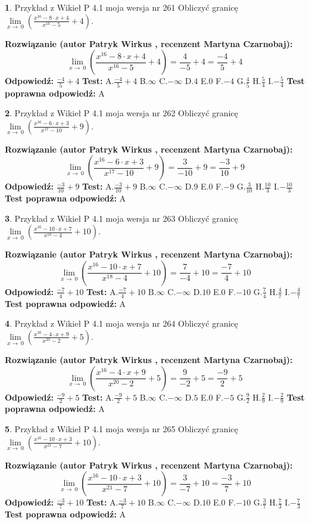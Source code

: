 \documentclass[12pt, a4paper]{article}
\theoremstyle{definition} %
\newtheorem{zad}{}
\newcommand{\zadStart}[1]{\begin{zad}#1\newline}
\newcommand{\zadStop}{\end{zad}}
\newcommand{\rozwStart}[2]{\noindent \textbf{Rozwiązanie (autor #1 , recenzent #2): }\newline}
\newcommand{\rozwStop}{\newline}
\newcommand{\odpStart}{\noindent \textbf{Odpowiedź:}\newline}
\newcommand{\odpStop}{\newline}
\newcommand{\testStart}{\noindent \textbf{Test:}\newline}
\newcommand{\testStop}{\newline}
\newcommand{\kluczStart}{\noindent \textbf{Test poprawna odpowiedź:}\newline}
\newcommand{\kluczStop}{\newline}
\begin{document}
\zadStart{Przykład z Wikieł P 4.1 moja wersja nr 261}
Obliczyć granicę $\lim\limits_{x\to\ 0}(\frac{x^{16}-8 \cdot x +4}{x^{16}-5}+4)$.
\zadStop
\rozwStart{Patryk Wirkus}{Martyna Czarnobaj}
$$\lim\limits_{x\to\ 0}(\frac{x^{16}-8 \cdot x +4}{x^{16}-5}+4)=\frac{4}{-5}+4=\frac{-4}{5}+4$$
\rozwStop
\odpStart
$\frac{-4}{5}+4$
\odpStop
\testStart
A.$\frac{-4}{5}+4$
B.$\infty$
C.$-\infty$
D.$4$
E.$0$
F.$-4$
G.$\frac{4}{5}$
H.$\frac{5}{4}$
I.$-\frac{5}{4}$
\testStop
\kluczStart
A
\kluczStop



\zadStart{Przykład z Wikieł P 4.1 moja wersja nr 262}
Obliczyć granicę $\lim\limits_{x\to\ 0}(\frac{x^{16}-6 \cdot x +3}{x^{17}-10}+9)$.
\zadStop
\rozwStart{Patryk Wirkus}{Martyna Czarnobaj}
$$\lim\limits_{x\to\ 0}(\frac{x^{16}-6 \cdot x +3}{x^{17}-10}+9)=\frac{3}{-10}+9=\frac{-3}{10}+9$$
\rozwStop
\odpStart
$\frac{-3}{10}+9$
\odpStop
\testStart
A.$\frac{-3}{10}+9$
B.$\infty$
C.$-\infty$
D.$9$
E.$0$
F.$-9$
G.$\frac{3}{10}$
H.$\frac{10}{3}$
I.$-\frac{10}{3}$
\testStop
\kluczStart
A
\kluczStop



\zadStart{Przykład z Wikieł P 4.1 moja wersja nr 263}
Obliczyć granicę $\lim\limits_{x\to\ 0}(\frac{x^{16}-10 \cdot x +7}{x^{18}-4}+10)$.
\zadStop
\rozwStart{Patryk Wirkus}{Martyna Czarnobaj}
$$\lim\limits_{x\to\ 0}(\frac{x^{16}-10 \cdot x +7}{x^{18}-4}+10)=\frac{7}{-4}+10=\frac{-7}{4}+10$$
\rozwStop
\odpStart
$\frac{-7}{4}+10$
\odpStop
\testStart
A.$\frac{-7}{4}+10$
B.$\infty$
C.$-\infty$
D.$10$
E.$0$
F.$-10$
G.$\frac{7}{4}$
H.$\frac{4}{7}$
I.$-\frac{4}{7}$
\testStop
\kluczStart
A
\kluczStop



\zadStart{Przykład z Wikieł P 4.1 moja wersja nr 264}
Obliczyć granicę $\lim\limits_{x\to\ 0}(\frac{x^{16}-4 \cdot x +9}{x^{20}-2}+5)$.
\zadStop
\rozwStart{Patryk Wirkus}{Martyna Czarnobaj}
$$\lim\limits_{x\to\ 0}(\frac{x^{16}-4 \cdot x +9}{x^{20}-2}+5)=\frac{9}{-2}+5=\frac{-9}{2}+5$$
\rozwStop
\odpStart
$\frac{-9}{2}+5$
\odpStop
\testStart
A.$\frac{-9}{2}+5$
B.$\infty$
C.$-\infty$
D.$5$
E.$0$
F.$-5$
G.$\frac{9}{2}$
H.$\frac{2}{9}$
I.$-\frac{2}{9}$
\testStop
\kluczStart
A
\kluczStop



\zadStart{Przykład z Wikieł P 4.1 moja wersja nr 265}
Obliczyć granicę $\lim\limits_{x\to\ 0}(\frac{x^{16}-10 \cdot x +3}{x^{21}-7}+10)$.
\zadStop
\rozwStart{Patryk Wirkus}{Martyna Czarnobaj}
$$\lim\limits_{x\to\ 0}(\frac{x^{16}-10 \cdot x +3}{x^{21}-7}+10)=\frac{3}{-7}+10=\frac{-3}{7}+10$$
\rozwStop
\odpStart
$\frac{-3}{7}+10$
\odpStop
\testStart
A.$\frac{-3}{7}+10$
B.$\infty$
C.$-\infty$
D.$10$
E.$0$
F.$-10$
G.$\frac{3}{7}$
H.$\frac{7}{3}$
I.$-\frac{7}{3}$
\testStop
\kluczStart
A
\kluczStop
\end{document}
